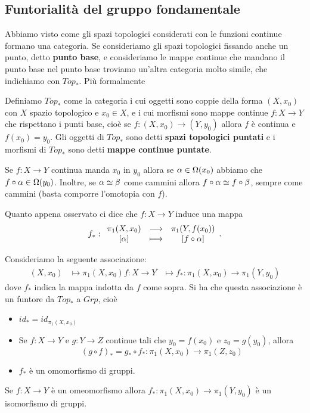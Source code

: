\begin{multicols*}{2}
\subsection{Funtorialità del gruppo fondamentale}
Abbiamo visto come gli spazi topologici considerati con le funzioni continue formano una categoria. Se consideriamo gli spazi topologici fissando anche un punto, detto \textbf{punto base}, e consideriamo le mappe continue che mandano il punto base nel punto base troviamo un'altra categoria molto simile, che indichiamo con $Top_\ast$. Più formalmente
\begin{definition}
Definiamo $Top_\ast$ come la categoria i cui oggetti sono coppie della forma $(X,x_0)$ con $X$ spazio topologico e $x_0\in X$, e i cui morfismi sono mappe continue $f:X\to Y$ che rispettano i punti base, cioè se $f:(X,x_0)\to(Y,y_0)$ allora $f$ è continua e $f(x_0)=y_0$. Gli oggetti di $Top_\ast$ sono detti \textbf{spazi topologici puntati} e i morfismi di $Top_\ast$ sono detti \textbf{mappe continue puntate}.
\end{definition}

\begin{remark}
Se $f:X\to Y$ continua manda $x_0$ in $y_0$ allora se $\alpha\in\Omega(x_0)$ abbiamo che $f\circ \alpha\in\Omega(y_0)$. Inoltre, se $\alpha\simeq \beta$ come cammini allora $f\circ \alpha\simeq f\circ \beta$, sempre come cammini (basta comporre l'omotopia con $f$).
\end{remark}
\noindent Quanto appena osservato ci dice che $f:X\to Y$ induce una mappa
\[f_\ast:\begin{array}{ccc} {\pi_1(X,x_0)} & \longrightarrow & {\pi_1(Y,f(x_0))}\\ {[\alpha]} & \longmapsto & {[f\circ \alpha]} \end{array}.\]

\begin{proposition}\label{FuntorialitaDaMappePuntateAOmomorfismiDeiGruppiFondamentali}
Consideriamo la seguente associazione:
\begin{align*}
(X,x_0)&\mapsto\pi_1(X,x_0)
f:X\to Y&\mapsto f_\ast:\pi_1(X,x_0)\to\pi_1(Y,y_0)
\end{align*}
dove $f_\ast$ indica la mappa indotta da $f$ come sopra.
Si ha che questa associazione è un funtore da $Top_\ast$ a $Grp$, cioè
\begin{itemize}[noitemsep]
\item $id_\ast=id_{\pi_1(X,x_0)}$
\item Se $f:X\to Y$ e $g:Y\to Z$ continue tali che $y_0=f(x_0)$ e $z_0=g(y_0)$, allora
\[(g\circ f)_\ast=g_\ast\circ f_\ast:\pi_1(X,x_0)\to\pi_1(Z,z_0)\]
\item $f_\ast$ è un omomorfismo di gruppi.
\end{itemize}
\end{proposition}
\begin{corollary}
Se $f:X\to Y$ è un omeomorfismo allora $f_\ast:\pi_1(X,x_0)\to\pi_1(Y,y_0)$ è un isomorfismo di gruppi.
\end{corollary}


\end{multicols*}
